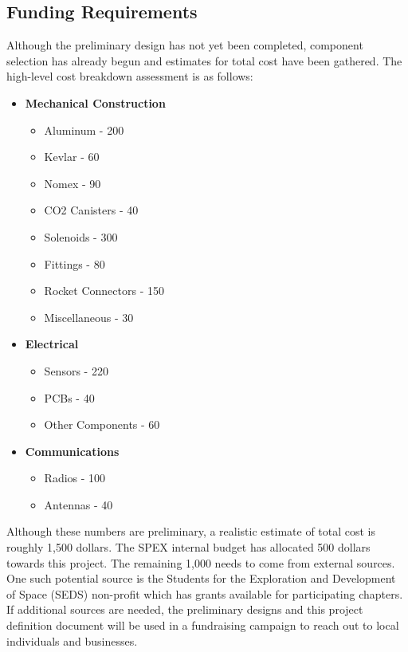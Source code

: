 \documentclass[conference]{IEEEtran} %
\begin{document}
\subsection{Funding Requirements}
\label{subsec:Funding Requirements}
Although the preliminary design has not yet been completed, component selection has already begun and estimates for total cost have been
gathered. The high-level cost breakdown assessment is as follows:
\begin{itemize}
  \item \textbf{Mechanical Construction}
  \begin{itemize}
    \item Aluminum - 200
    \item Kevlar - 60
    \item Nomex - 90
    \item CO2 Canisters - 40
    \item Solenoids - 300
    \item Fittings - 80
    \item Rocket Connectors - 150
    \item Miscellaneous - 30
  \end{itemize}

  \item \textbf{Electrical}
  \begin{itemize}
    \item Sensors - 220
    \item PCBs - 40
    \item Other Components - 60
  \end{itemize}

  \item \textbf{Communications}
  \begin{itemize}
    \item Radios - 100
    \item Antennas - 40
  \end{itemize}
\end{itemize}

Although these numbers are preliminary, a realistic estimate of total cost is roughly 1,500 dollars. The SPEX internal budget has allocated 500 dollars
towards this project. The remaining 1,000 needs to come from external sources. One such potential source is the Students for the Exploration and Development
of Space (SEDS) non-profit which has grants available for participating chapters. If additional sources are needed, the preliminary designs and this
project definition document will be used in a fundraising campaign to reach out to local individuals and businesses.
\end{document}
